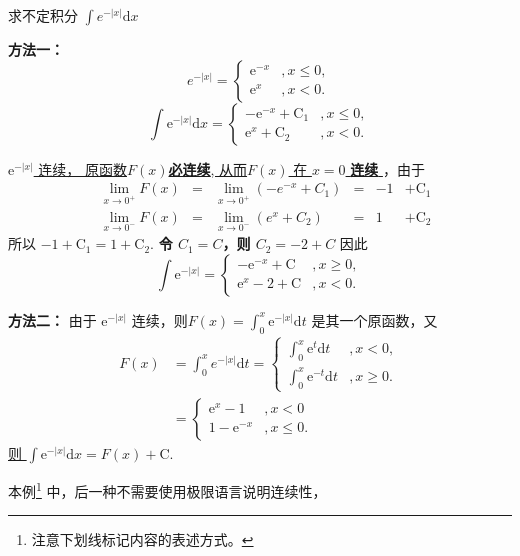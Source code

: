 \begin{example}
    求不定积分 $\int e ^{-|x|} \mathrm{d} x$

    \textbf{方法一：}
    \[
        e^{-|x|} = \left\{
            \begin{array}{rl}
                \mathrm{e} ^{-x} &, x \leq 0, \\
                \mathrm{e} ^x    &, x < 0.
            \end{array}
        \right.
    \]
    \[
        \int \mathrm{e} ^{-|x|} \mathrm{d} x = \left\{
            \begin{array}{rl}
                - \mathrm{e} ^{-x} + \mathrm{C_1} &, x \leq 0, \\
                  \mathrm{e} ^x    + \mathrm{C_2} &, x < 0.
            \end{array}
        \right.
    \]

    \uline{
        $\mathrm{e}^{-|x|}$ 连续，
        原函数$F(x)$\textbf{必连续}, 从而$F(x)$
        在 $x = 0$ \textbf{连续}
    }，由于
    \begin{align*}
        &\lim_{x \to 0^+} F(x) &= &\lim_{x \to 0^+}(-e^{-x} + C_{1})&=& -1& +\mathrm{C_{1}}  \\
        &\lim_{x \to 0^-} F(x) &= &\lim_{x \to 0^-}(e^{x} + C_{2})  &=&  1& +\mathrm{C_{2}} 
    \end{align*}
    所以 $ -1 + \mathrm{C_1} = 1 + \mathrm{C_2}$.
    \textbf{令 $C_1 = C$，则 $C_2 = -2 + C$} 因此
    \[
        \int \mathrm{e}^{-|x|} = \left\{
            \begin{array}{rl}
                - \mathrm{e}^{-x} + \mathrm{C} &, x \geq 0, \\
                  \mathrm{e}^{ x} - 2 + \mathrm{C} &, x < 0.
            \end{array}
        \right.
    \]

    \begin{center}
    \raisebox{0.5ex}{\rule{\textwidth}{0.3pt}}
    \end{center}

    \textbf{方法二：}
    由于 $\mathrm{e}^{-|x|}$ 连续，则$F(x) = \int_{0}^{x} \mathrm{e}^{-|x|} \mathrm{d} t$
    是其一个原函数，又
    \begin{align*}
        F(x) &= \int_{0}^{x} e^{-|x|} \mathrm{d} t = 
        \left\{
            \begin{array}{rl}
                \int_{0}^{x} \mathrm{e}^t    \mathrm{d} t &, x < 0, \\
                \int_{0}^{x} \mathrm{e}^{-t} \mathrm{d} t &, x \geq 0.
            \end{array}
        \right. \\
        &= \left\{
            \begin{array}{rl}
                \mathrm{e}^x - 1 &, x < 0 \\
                1 - \mathrm{e}^{-x} &, x \leq 0.
            \end{array}
        \right.
    \end{align*}
    \underline{则 $\int \mathrm{e}^{-|x|} \mathrm{d} x = F(x) + \mathrm{C}$}.
\end{example}
本例\footnote{注意下划线标记内容的表述方式。}
中，后一种不需要使用极限语言说明连续性，

